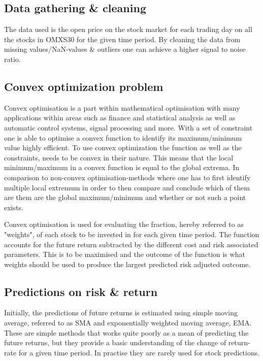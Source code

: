 \documentclass[final]{LTHtwocol} %
\begin{document}
\subsection{Data gathering \& cleaning}
The data used is the open price on the stock market for each trading day on all the stocks in OMXS30 for the given time period. By cleaning the data from missing values/NaN-values \& outliers one can achieve a higher signal to noise ratio.

\subsection{Convex optimization problem}
Convex optimisation is a part within mathematical optimisation with many applications within areas such as finance and statistical analysis as well as automatic control systems, signal processing and more. With a set of constraint one is able to optimise a convex function to identify its maximum/minimum value highly efficient. To use convex optimization the function as well as the constraints, needs to be convex in their nature. This means that the local minimum/maximum in a convex function is equal to the global extrema. In comparison to non-convex optimisation-methods where one has to first identify multiple local extremum in order to then compare and conclude which of them are them are the global maximum/minimum and whether or not such a point exists. \cite{Boyd}




Convex optimisation is used for evaluating the fraction, hereby referred to as "weights", of each stock to be invested in for each given time period. The function accounts for the future return subtracted by the different cost and risk associated parameters. This is to be maximised and the outcome of the function is what weights should be used to produce the largest predicted risk adjusted outcome.\cite{Boyd}

\subsection{Predictions on risk \& return}
Initially, the predictions of future returns is estimated using simple moving average, referred to as SMA and exponentially weighted moving average, EMA. These are simple methods that works quite poorly as a mean of predicting the future returns, but they provide a basic understanding of the change of return-rate for a given time period. In practise they are rarely used for stock predictions. 
\end{document}
